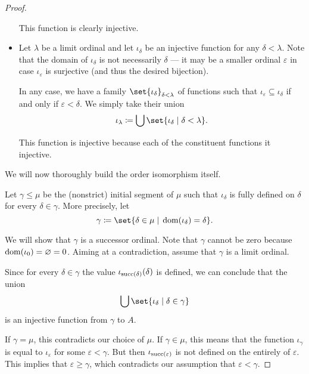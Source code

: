 \begin{proof}
\begin{itemize}
    This function is clearly injective.

    \item Let \( \lambda \) be a limit ordinal and let \( \iota_\delta \) be an injective function for any \( \delta < \lambda \). Note that the domain of \( \iota_\delta \) is not necessarily \( \delta \) --- it may be a smaller ordinal \( \varepsilon \) in case \( \iota_\varepsilon \) is surjective (and thus the desired bijection).

    In any case, we have a family \( \set{ \iota_\delta }_{\delta < \lambda} \) of functions such that \( \iota_\varepsilon \subseteq \iota_\delta \) if and only if \( \varepsilon < \delta \). We simply take their union
    \begin{equation*}
      \iota_\lambda \coloneqq \bigcup \set{ \iota_\delta \given \delta < \lambda }.
    \end{equation*}

    This function is injective because each of the constituent functions it injective.
  \end{itemize}

  We will now thoroughly build the order isomorphism itself.

  Let \( \gamma \leq \mu \) be the (nonstrict) initial segment of \( \mu \) such that \( \iota_\delta \) is fully defined on \( \delta \) for every \( \delta \in \gamma \). More precisely, let
  \begin{equation*}
    \gamma \coloneqq \set{ \delta \in \mu \given \dom(\iota_\delta) = \delta }.
  \end{equation*}

  We will show that \( \gamma \) is a successor ordinal. Note that \( \gamma \) cannot be zero because \( \operatorname{dom}(\iota_0) = \varnothing = 0 \). Aiming at a contradiction, assume that \( \gamma \) is a limit ordinal.

  Since for every \( \delta \in \gamma \) the value \( \iota_{\operatorname{succ}(\delta)}(\delta) \) is defined, we can conclude that the union
  \begin{equation*}
    \bigcup\set{ \iota_\delta \given \delta \in \gamma }
  \end{equation*}
  is an injective function from \( \gamma \) to \( A \).

  If \( \gamma = \mu \), this contradicts our choice of \( \mu \). If \( \gamma \in \mu \), this means that the function \( \iota_\gamma \) is equal to \( \iota_\varepsilon \) for some \( \varepsilon < \gamma \). But then \( \iota_{\operatorname{succ}(\varepsilon)} \) is not defined on the entirely of \( \varepsilon \). This implies that \( \varepsilon \geq \gamma \), which contradicts our assumption that \( \varepsilon < \gamma \).


\end{proof}
